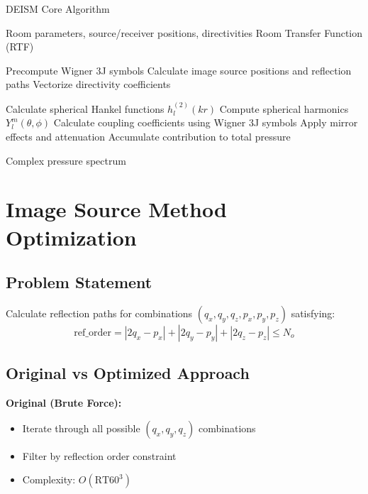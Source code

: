 \documentclass[11pt,a4paper]{article}
\begin{document}
\begin{algorithm}[H]
\caption{DEISM Core Algorithm}
\begin{algorithmic}[1]
\Require Room parameters, source/receiver positions, directivities
\Ensure Room Transfer Function (RTF)

\State Precompute Wigner 3J symbols
\State Calculate image source positions and reflection paths
\State Vectorize directivity coefficients

        \State Calculate spherical Hankel functions $h_l^{(2)}(kr)$
        \State Compute spherical harmonics $Y_l^m(\theta, \phi)$
                \State Calculate coupling coefficients using Wigner 3J symbols
                \State Apply mirror effects and attenuation
                \State Accumulate contribution to total pressure
            \EndFor
        \EndFor
    \EndFor
\EndFor

\State \Return Complex pressure spectrum
\end{algorithmic}
\end{algorithm}

\section{Image Source Method Optimization}

\subsection{Problem Statement}

Calculate reflection paths for combinations $(q_x, q_y, q_z, p_x, p_y, p_z)$ satisfying:
\begin{equation}
\text{ref\_order} = |2q_x - p_x| + |2q_y - p_y| + |2q_z - p_z| \leq N_o
\end{equation}

\subsection{Original vs Optimized Approach}

\textbf{Original (Brute Force):}
\begin{itemize}
    \item Iterate through all possible $(q_x, q_y, q_z)$ combinations
    \item Filter by reflection order constraint
    \item Complexity: $O(\text{RT60}^3)$
\end{itemize}
\end{document}
